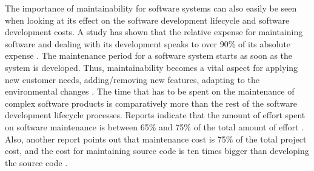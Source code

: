 The importance of maintainability for software systems can also easily be seen when looking at its effect on the software development lifecycle and software development costs. A study has shown that the relative expense for maintaining software and dealing with its development speaks to over 90\% of its absolute expense \cite{4}. The maintenance period for a software system starts as soon as the system is developed. Thus, maintainability becomes a vital aspect for applying new customer needs, adding/removing new features, adapting to the environmental changes \cite{23}. The time that has to be spent on the maintenance of complex software products is comparatively more than the rest of the software development lifecycle processes. Reports indicate that the amount of effort spent on software maintenance is between 65\% and 75\% of the total amount of effort \cite{13}. Also, another report points out that maintenance cost is 75\% of the total project cost, and the cost for maintaining source code is ten times bigger than developing the source code \cite{22}.
